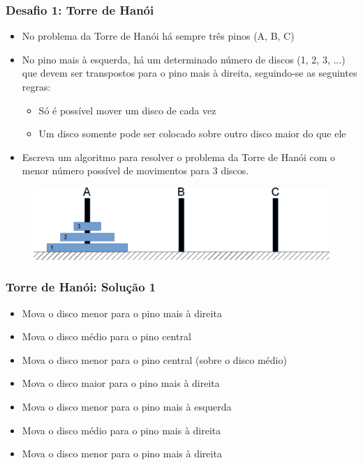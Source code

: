 \documentclass[aspectratio=169]{beamer}
\begin{document}
\begin{frame}\frametitle{Desafio 1: Torre de Hanói}
\begin{itemize}
	\item No problema da Torre de Hanói há sempre três pinos (A, B, C)
	\item No pino mais à esquerda, há um determinado número de discos (1, 2, 3, ...) que devem ser transpostos para o pino mais à direita, seguindo-se as seguintes regras:
	\begin{itemize}	
		\item Só é possível mover um disco de cada vez
		\item Um disco somente pode ser colocado sobre outro disco maior do que ele
	\end{itemize}
	\item Escreva um algoritmo para resolver o problema da Torre de Hanói com o menor número possível de movimentos para 3 discos.
\end{itemize}
\begin{figure}[h]
	\centering
	\includegraphics[height=0.3\paperheight]{pucrs-ep-fprog-unidade_01-introducao-laminas-torre_de_hanoi.png}
\end{figure}
\end{frame}

\begin{frame}\frametitle{Torre de Hanói: Solução 1}
\begin{itemize}
	\item Mova o disco menor para o pino mais à direita
	\item Mova o disco médio para o pino central
	\item Mova o disco menor para o pino central (sobre o disco médio)
	\item Mova o disco maior para o pino mais à direita
	\item Mova o disco menor para o pino mais à esquerda
	\item Mova o disco médio para o pino mais à direita
	\item Mova o disco menor para o pino mais à direita
\end{itemize}
\end{frame}
\end{document}
